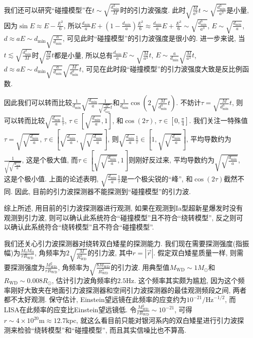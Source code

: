 \documentclass[12pt]{ctexart}
\begin{document}
我们还可以研究``碰撞模型''在$t\sim\sqrt{\frac{d_\text{min}^3}{M}}$时的引力波强度. 此时$\sqrt{\frac{M}{a^3}}t\sim\sqrt{\frac{d_\text{min}^3}{a^3}}$是小量, 因为$\sin E\approx E-\frac{E^3}{6}$, 所以$\frac{d_\text{min}}{a}E+\left(1-\frac{d_\text{min}}{a}\right)\frac{E^3}{6}\approx\frac{d_\text{min}}{a}E+\frac{E^3}{6}\sim\sqrt{\frac{d_\text{min}^3}{a^3}}$, $E\sim\sqrt{\frac{d_\text{min}}{a}}$, $d\approx aE\sim d_\text{min}\sqrt{\frac{a}{d_\text{min}}}$, 可见此时``碰撞模型''的引力波强度是很小的. 进一步来说, 当$t\lesssim\sqrt{\frac{d_\text{min}^3}{M}}$时$\sqrt{\frac{M}{a^3}}t$都是小量, 所以总有$\frac{d_\text{min}}{a}E\sim\sqrt{\frac{M}{a^3}}t$, $E\sim\frac{a}{d_\text{min}}\sqrt{\frac{M}{a^3}}t$, $d\approx aE\sim d_\text{min}\sqrt{\frac{a}{d_\text{min}}}\sqrt{\frac{M}{d_\text{min}^3}}t$, 可见在此时段``碰撞模型''的引力波强度大致是反比例函数.

因此我们可以转而比较$\frac{1}{d_\text{min}}\sqrt{\frac{d_\text{min}}{a}}\frac{1}{\sqrt{\frac{M}{d_\text{min}^3}}t}$和$\frac{1}{d_\text{min}}\cos\left(2\sqrt{\frac{ M}{d_\text{min}^3}}t\right)$. 不妨计$\tau=\sqrt{\frac{ M}{d_\text{min}^3}}t$, 则可以转而比较$\sqrt{\frac{d_\text{min}}{a}}\frac{1}{\tau}$, $\tau\in[\sqrt{\frac{d_\text{min}}{a}},1]$, 和$\cos\left(2\tau\right)$, $\tau\in[0,\frac{\pi}{4}]$. 我们关注一特殊值$\tau=\sqrt{\sqrt{\frac{d_\text{min}}{a}}}$, $\tau\in[\sqrt{\frac{d_\text{min}}{a}},\sqrt{\sqrt{\frac{d_\text{min}}{a}}}]$, 则$\sqrt{\frac{d_\text{min}}{a}}\frac{1}{\tau}\in[1,\sqrt{\sqrt{\frac{d_\text{min}}{a}}}]$, 平均导数约为$\frac{1}{\sqrt{\sqrt{\frac{d_\text{min}}{a}}}}$, 这是个极大值, 而$\tau\in[\sqrt{\sqrt{\frac{d_\text{min}}{a}}},1]$则刚好反过来, 平均导数约为$\sqrt{\sqrt{\frac{d_\text{min}}{a}}}$, 这是个极小值. 上面的论述表明, $\sqrt{\frac{d_\text{min}}{a}}\frac{1}{\tau}$是一个极尖锐的``峰'', 和$\cos\left(2\tau\right)$截然不同. 因此, 目前的引力波探测器不能探测到``碰撞模型''的引力波.

综上所述, 用目前的引力波探测器进行观测, 如果在观测到Ia型超新星爆发时没有观测到引力波, 则可以确认此系统符合``碰撞模型''且不符合``绕转模型'', 反之则可以确认此系统符合``绕转模型''且不符合``碰撞模型''.

我们还关心引力波探测器对绕转双白矮星的探测能力. 我们现在需要探测强度(指振幅)为$\frac{M_\text{I}M_\text{II}}{r R_\text{WD}}$, 角频率为$2\sqrt{\frac{ M}{R_\text{WD}^3}}$的引力波, 其中$r=\left\lvert\vec{r}\right\rvert$. 假定双白矮星质量一样, 则需要探测强度为$\frac{M_\text{WD}^2}{r R_\text{WD}}$, 角频率为$\sqrt{\frac{ 8M_\text{WD}}{R_\text{WD}^3}}$的引力波. 用典型值$M_\text{WD}\sim1M_\odot$和$R_\text{WD}\sim0.008R_\odot$\cite{Carroll2007}, 估计引力波角频率约$2.5\text{Hz}$. 这个频率其实颇为尴尬, 因为这个频率刚好大致夹在地面引力波探测器和空间引力波探测器的最佳观测频段之间, 两者都不太好观测. 保守估计, Einstein望远镜在此频率的应变约为$10^{-21}/\text{Hz}^{-1/2}$, 而LISA在此频率的应变比Einstein望远镜低\cite{Wang2020}. 令$\frac{M_\text{WD}^2}{r R_\text{WD}}\sim10^{-21}$, 可得$r\sim4\times10^{20}\text{m}\approx12.7\text{kpc}$, 就这么看目前只能对银河系内的双白矮星进行引力波探测来检验``绕转模型''和``碰撞模型'', 而且其实信噪比也不算高.
\end{document}
